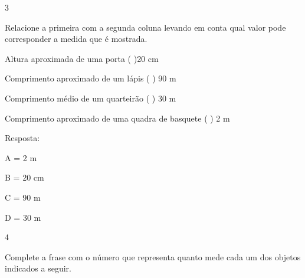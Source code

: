 \num{3}

Relacione a primeira com a segunda coluna levando em conta qual valor
pode corresponder a medida que é mostrada.

\begin{escolha}

\item
  Altura aproximada de uma porta ( )20 cm
\item
  Comprimento aproximado de um lápis ( ) 90 m
\item
  Comprimento médio de um quarteirão ( ) 30 m
\item
  Comprimento aproximado de uma quadra de basquete ( ) 2 m

\end{escolha}

Resposta:

A = 2 m

B = 20 cm

C = 90 m

D = 30 m


\num{4}

Complete a frase com o número que representa quanto mede cada um dos
objetos indicados a seguir.

